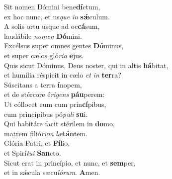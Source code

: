 \evenverse Sit nomen Dómini bene\textbf{dí}ctum,~\*\\
\evenverse ex hoc nunc, et us\textit{que} \textit{in} \textbf{sǽ}culum.\\
\oddverse A solis ortu usque ad oc\textbf{cá}sum,~\*\\
\oddverse laudábile \textit{no}\textit{men} \textbf{Dó}mini.\\
\evenverse Excélsus super omnes gentes \textbf{Dó}minus,~\*\\
\evenverse et super cælos gló\textit{ri}\textit{a} \textbf{e}jus.\\
\oddverse Quis sicut Dóminus, Deus noster, qui in altis \textbf{há}bitat,~\*\\
\oddverse et humília réspicit in cælo \textit{et} \textit{in} \textbf{ter}ra?\\
\evenverse Súscitans a terra \textbf{í}nopem,~\*\\
\evenverse et de stércore é\textit{ri}\textit{gens} \textbf{páu}perem:\\
\oddverse Ut cóllocet eum cum prin\textbf{cí}pibus,~\*\\
\oddverse cum princípibus pó\textit{pu}\textit{li} \textbf{su}i.\\
\evenverse Qui habitáre facit stérilem in \textbf{do}mo,~\*\\
\evenverse matrem filió\textit{rum} \textit{læ}\textbf{tán}tem.\\
\oddverse Glória Patri, et \textbf{Fí}lio,~\*\\
\oddverse et Spirí\textit{tu}\textit{i} \textbf{San}cto.\\
\evenverse Sicut erat in princípio, et nunc, et \textbf{sem}per,~\*\\
\evenverse et in sǽcula sæcu\textit{ló}\textit{rum}. \textbf{A}men.\\
